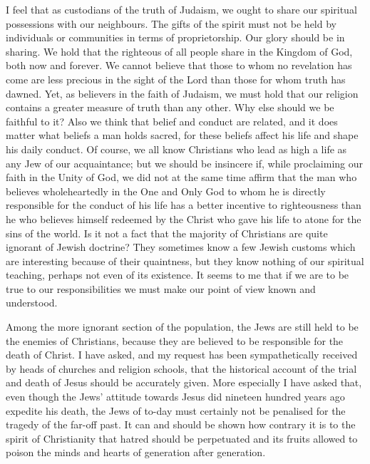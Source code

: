 I feel that as custodians of the truth of Judaism, we
ought to share our spiritual possessions with our neighbours.
The gifts of the spirit must not be held by
individuals or communities in terms of proprietorship.
Our glory should be in sharing. We hold that the righteous
of all people share in the Kingdom of God, both now
and forever. We cannot believe that those to whom no
revelation has come are less precious in the sight of the
Lord than those for whom truth has dawned. Yet, as
believers in the faith of Judaism, we must hold that our
religion contains a greater measure of truth than any
other. Why else should we be faithful to it? Also we
think that belief and conduct are related, and it does
matter what beliefs a man holds sacred, for these beliefs
affect his life and shape his daily conduct. Of course,
we all know Christians who lead as high a life as any Jew
of our acquaintance; but we should be insincere if, while
proclaiming our faith in the Unity of God, we did not at
the same time affirm that the man who believes wholeheartedly
in the One and Only God to whom he is directly
responsible for the conduct of his life has a better incentive
to righteousness than he who believes himself
redeemed by the Christ who gave his life to atone for the
sins of the world. Is it not a fact that the majority of
Christians are quite ignorant of Jewish doctrine? They
sometimes know a few Jewish customs which are interesting
because of their quaintness, but they know nothing
of our spiritual teaching, perhaps not even of its
existence. It seems to me that if we are to be true to our
responsibilities we must make our point of view known
and understood.

Among the more ignorant section of the population,
the Jews are still held to be the enemies of Christians,
because they are believed to be responsible for the death
of Christ. I have asked, and my request has been
sympathetically received by heads of churches and
religion schools, that the historical account of the trial
and death of Jesus should be accurately given. More
especially I have asked that, even though the Jews’
attitude towards Jesus did nineteen hundred years ago
expedite his death, the Jews of to-day must certainly
not be penalised for the tragedy of the far-off past. It
can and should be shown how contrary it is to the spirit
of Christianity that hatred should be perpetuated and
its fruits allowed to poison the minds and hearts of
generation after generation.

